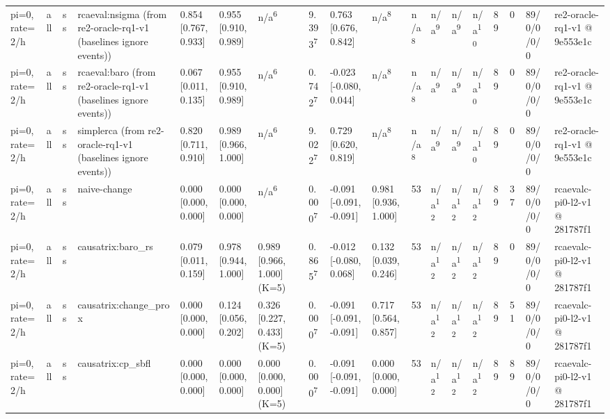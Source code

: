 \begin{table}[t]
\begin{tabular}{llllllllllllllllll}
pi=0, rate=2/h & all & ss & rcaeval:nsigma (from re2-oracle-rq1-v1 (baselines ignore events)) & 0.854 [0.767, 0.933] & 0.955 [0.910, 0.989] & n/a\textsuperscript{6} & 9.393\textsuperscript{7} & 0.763 [0.676, 0.842] & n/a\textsuperscript{8} & n/a\textsuperscript{8} & n/a\textsuperscript{9} & n/a\textsuperscript{9} & n/a\textsuperscript{10} & 89 & 0 & 89/0/0/0/0 & re2-oracle-rq1-v1 @ 9e553e1c \\
pi=0, rate=2/h & all & ss & rcaeval:baro (from re2-oracle-rq1-v1 (baselines ignore events)) & 0.067 [0.011, 0.135] & 0.955 [0.910, 0.989] & n/a\textsuperscript{6} & 0.742\textsuperscript{7} & -0.023 [-0.080, 0.044] & n/a\textsuperscript{8} & n/a\textsuperscript{8} & n/a\textsuperscript{9} & n/a\textsuperscript{9} & n/a\textsuperscript{10} & 89 & 0 & 89/0/0/0/0 & re2-oracle-rq1-v1 @ 9e553e1c \\
pi=0, rate=2/h & all & ss & simplerca (from re2-oracle-rq1-v1 (baselines ignore events)) & 0.820 [0.711, 0.910] & 0.989 [0.966, 1.000] & n/a\textsuperscript{6} & 9.022\textsuperscript{7} & 0.729 [0.620, 0.819] & n/a\textsuperscript{8} & n/a\textsuperscript{8} & n/a\textsuperscript{9} & n/a\textsuperscript{9} & n/a\textsuperscript{10} & 89 & 0 & 89/0/0/0/0 & re2-oracle-rq1-v1 @ 9e553e1c \\
pi=0, rate=2/h & all & ss & naive-change & 0.000 [0.000, 0.000] & 0.000 [0.000, 0.000] & n/a\textsuperscript{6} & 0.000\textsuperscript{7} & -0.091 [-0.091, -0.091] & 0.981 [0.936, 1.000] & 53 & n/a\textsuperscript{12} & n/a\textsuperscript{12} & n/a\textsuperscript{12} & 89 & 37 & 89/0/0/0/0 & rcaevalc-pi0-l2-v1 @ 281787f1 \\
pi=0, rate=2/h & all & ss & causatrix:baro\_rs & 0.079 [0.011, 0.159] & 0.978 [0.944, 1.000] & 0.989 [0.966, 1.000] (K=5) & 0.865\textsuperscript{7} & -0.012 [-0.080, 0.068] & 0.132 [0.039, 0.246] & 53 & n/a\textsuperscript{12} & n/a\textsuperscript{12} & n/a\textsuperscript{12} & 89 & 0 & 89/0/0/0/0 & rcaevalc-pi0-l2-v1 @ 281787f1 \\
pi=0, rate=2/h & all & ss & causatrix:change\_prox & 0.000 [0.000, 0.000] & 0.124 [0.056, 0.202] & 0.326 [0.227, 0.433] (K=5) & 0.000\textsuperscript{7} & -0.091 [-0.091, -0.091] & 0.717 [0.564, 0.857] & 53 & n/a\textsuperscript{12} & n/a\textsuperscript{12} & n/a\textsuperscript{12} & 89 & 51 & 89/0/0/0/0 & rcaevalc-pi0-l2-v1 @ 281787f1 \\
pi=0, rate=2/h & all & ss & causatrix:cp\_sbfl & 0.000 [0.000, 0.000] & 0.000 [0.000, 0.000] & 0.000 [0.000, 0.000] (K=5) & 0.000\textsuperscript{7} & -0.091 [-0.091, -0.091] & 0.000 [0.000, 0.000] & 53 & n/a\textsuperscript{12} & n/a\textsuperscript{12} & n/a\textsuperscript{12} & 89 & 89 & 89/0/0/0/0 & rcaevalc-pi0-l2-v1 @ 281787f1 \\

\end{tabular}
\end{table}
